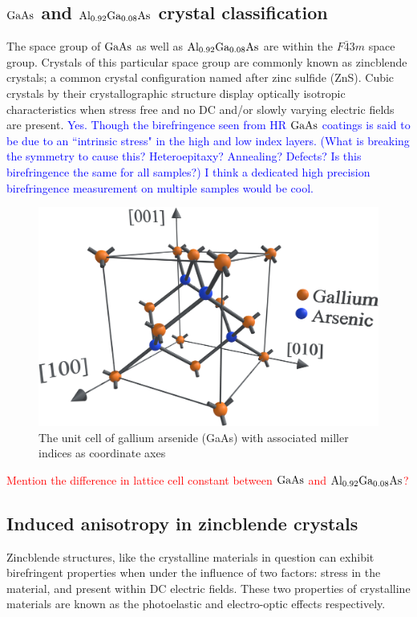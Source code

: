 \subsection{$\mathrm{GaAs}$ and $\mathrm{Al_{0.92}Ga_{0.08}As}$ crystal classification}
The space group of $\mathrm{GaAs}$ as well as $\mathrm{Al_{0.92}Ga_{0.08}As}$ are within the $F\bar{4}3m$ space group. Crystals of this particular space group are commonly known as zincblende crystals; a common crystal configuration named after zinc sulfide (ZnS). Cubic crystals by their crystallographic structure display optically isotropic characteristics when  stress free and no DC and/or slowly varying electric fields are present.
 \textcolor{blue}{Yes. Though the birefringence seen from HR $\mathrm{GaAs}$ coatings is said to be due to an ``intrinsic stress" in the high and low index layers. (What is breaking the symmetry to cause this? Heteroepitaxy? Annealing? Defects? Is this birefringence the same for all samples?) I think a dedicated high precision birefringence measurement on multiple samples would be cool.}

\begin{figure}[H]
\includegraphics[width=\textwidth]{figs/ALGAAS/gaas_unit_cell_mi.PNG}
\caption{The unit cell of gallium arsenide (GaAs) with associated miller indices as coordinate axes}
\label{fig:gaas_uc}
\end{figure}

\textcolor{red}{Mention the difference in lattice cell constant between $\mathrm{GaAs}$ and $\mathrm{Al_{0.92}Ga_{0.08}As}$?}

\subsection{Induced anisotropy in zincblende crystals}
Zincblende structures, like the crystalline materials in question can exhibit birefringent properties when under the influence of two factors: stress in the material, and present within DC electric fields. These two properties of crystalline materials are known as the photoelastic and electro-optic effects respectively.

